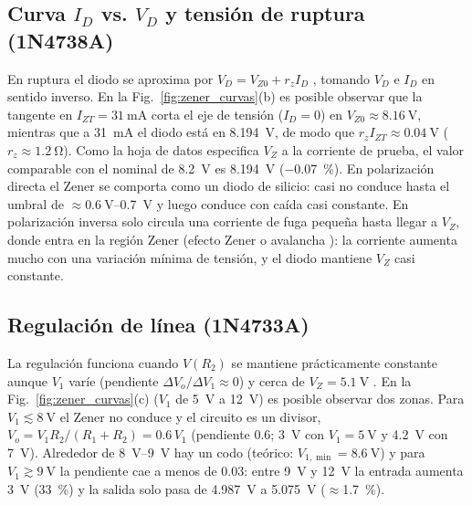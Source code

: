 \documentclass[9pt, conference]{IEEEtran}
\newcommand{\qV}[1]{\SI{#1}{\volt}}
\newcommand{\qmA}[1]{\SI{#1}{\milli\ampere}}
\newcommand{\qohm}[1]{\SI{#1}{\ohm}}
\newcommand{\pct}[1]{\SI{#1}{\percent}}
\begin{document}
\subsection{Curva $I_D$ vs. $V_D$ y tensión de ruptura (1N4738A)}
En ruptura el diodo se aproxima por $V_D=V_{Z0}+r_zI_D$ \cite{sedra}, tomando $V_D$ e $I_D$ en sentido inverso. En la Fig.~\ref{fig:zener_curvas}(b) es posible observar que la tangente en $I_{ZT}=\qmA{31}$ corta el eje de tensión ($I_D=0$) en $V_{Z0}\approx\qV{8.16}$, mientras que a \qmA{31} el diodo está en \qV{8.194}, de modo que $r_zI_{ZT}\approx\qV{0.04}$ ($r_z\approx\qohm{1.2}$). Como la hoja de datos especifica $V_Z$ a la corriente de prueba, el valor comparable con el nominal de \qV{8.2} es \qV{8.194} (\pct{-0.07}). En polarización directa el Zener se comporta como un diodo de silicio: casi no conduce hasta el umbral de $\approx\qV{0.6}$--\qV{0.7} y luego conduce con caída casi constante. En polarización inversa solo circula una corriente de fuga pequeña hasta llegar a $V_Z$, donde entra en la región Zener (efecto Zener o avalancha \cite{sedra}): la corriente aumenta mucho con una variación mínima de tensión, y el diodo mantiene $V_Z$ casi constante.

\subsection{Regulación de línea (1N4733A)}
La regulación funciona cuando $V(R_2)$ se mantiene prácticamente constante aunque $V_1$ varíe (pendiente $\Delta V_o/\Delta V_1\approx0$) y cerca de $V_Z=\qV{5.1}$ \cite{fairchild}. En la Fig.~\ref{fig:zener_curvas}(c) ($V_1$ de \qV{5} a \qV{12}) es posible observar dos zonas. Para $V_1\lesssim\qV{8}$ el Zener no conduce y el circuito es un divisor, $V_o=V_1R_2/(R_1+R_2)=0.6\,V_1$ (pendiente 0.6; \qV{3} con $V_1=\qV{5}$ y \qV{4.2} con \qV{7}). Alrededor de \qV{8}--\qV{9} hay un codo (teórico: $V_{1,\min}=\qV{8.6}$) y para $V_1\gtrsim\qV{9}$ la pendiente cae a menos de 0.03: entre \qV{9} y \qV{12} la entrada aumenta \qV{3} (\pct{33}) y la salida solo pasa de \qV{4.987} a \qV{5.075} ($\approx$\pct{1.7}).
\end{document}
